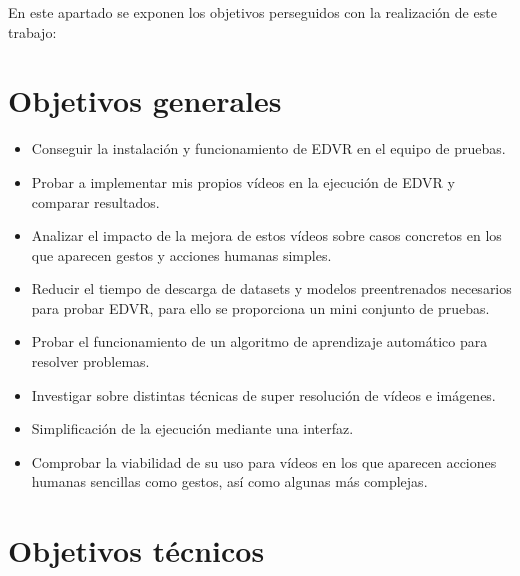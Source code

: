 
En este apartado se exponen los objetivos perseguidos con la realización de este trabajo: 


\section{Objetivos generales}

\begin{itemize}
    \item Conseguir la instalación y funcionamiento de EDVR en el equipo de pruebas.
    
    \item Probar a implementar mis propios vídeos en la ejecución de EDVR y comparar resultados.
    
     \item Analizar el impacto de la mejora de estos vídeos sobre casos concretos en los que aparecen gestos y acciones humanas simples.
    
    \item Reducir el tiempo de descarga de datasets y modelos preentrenados necesarios para probar EDVR, para ello se  proporciona un mini conjunto de pruebas.
    
     \item Probar el funcionamiento de un algoritmo de aprendizaje automático para resolver problemas.
     
    \item Investigar sobre distintas técnicas de super resolución de vídeos e imágenes.

    \item Simplificación de la ejecución mediante una interfaz.
    
    \item Comprobar la viabilidad de su uso para vídeos en los que aparecen acciones humanas sencillas como gestos, así como algunas más complejas.
\end{itemize}


\section{Objetivos técnicos}

